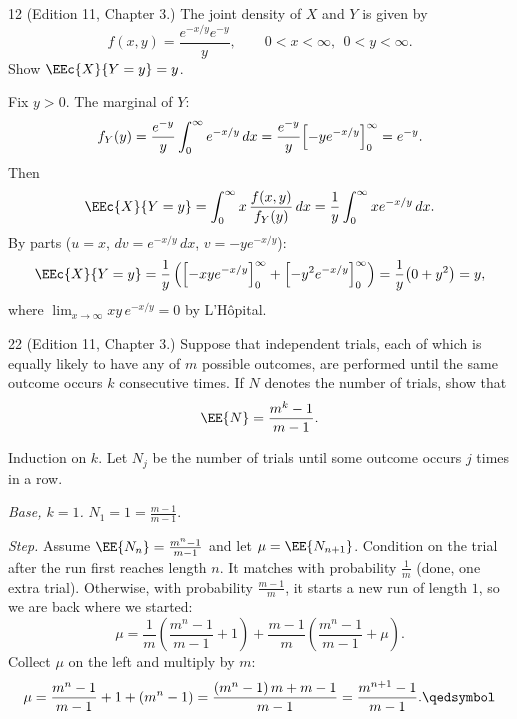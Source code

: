 \documentclass[11pt]{article}
\begin{document}
\begin{problem}{12}
  (Edition 11, Chapter 3.) The joint density of $X$ and $Y$ is given by
  \[
    f(x,y) = \frac{e^{-x/y} e^{-y}}{y}, \qquad 0 < x < \infty,\ \ 0 < y < \infty.
  \]
  Show $\EEc{X}{Y = y} = y$.
\end{problem}
Fix $y > 0$. The marginal of $Y$:
\[
  f_Y(y) = \frac{e^{-y}}{y}\int_0^{\infty} e^{-x/y}\,dx
         = \frac{e^{-y}}{y}\Bigl[-y e^{-x/y}\Bigr]_0^{\infty} = e^{-y}.
\]
Then
\[
  \EEc{X}{Y = y} = \int_0^{\infty} x\,\frac{f(x,y)}{f_Y(y)}\,dx
    = \frac{1}{y} \int_0^{\infty} x e^{-x/y}\,dx.
\]
By parts ($u = x$, $dv = e^{-x/y}\,dx$, $v = -y e^{-x/y}$):
\[
  \EEc{X}{Y = y}
    = \frac{1}{y}\left( \Bigl[-x y e^{-x/y}\Bigr]_0^{\infty}
        + \Bigl[-y^2 e^{-x/y}\Bigr]_0^{\infty} \right)
    = \frac{1}{y}\bigl(0 + y^2\bigr) = y,
\]
where $\lim_{x\to\infty} xy\,e^{-x/y} = 0$ by L'H\^opital. \qedsymbol

\begin{problem}{22}
  (Edition 11, Chapter 3.) Suppose that independent trials, each of which is
  equally likely to have any of $m$ possible outcomes, are performed until the
  same outcome occurs $k$ consecutive times. If $N$ denotes the number of
  trials, show that
  \[
    \EE{N} = \frac{m^{k} - 1}{m - 1}.
  \]
\end{problem}
Induction on $k$. Let $N_j$ be the number of trials until some outcome occurs $j$ times in a row.

\emph{Base, $k = 1$.} $N_1 = 1 = \frac{m - 1}{m - 1}$.

\emph{Step.} Assume $\EE{N_n} = \frac{m^n - 1}{m - 1}$ and let $\mu = \EE{N_{n+1}}$.
Condition on the trial after the run first reaches length $n$. It matches with probability $\frac1m$ (done, one extra trial).
Otherwise, with probability $\frac{m-1}{m}$, it starts a new run of length $1$, so we are back where we started:
\[
  \mu = \frac{1}{m}\left( \frac{m^n - 1}{m - 1} + 1 \right)
      + \frac{m - 1}{m}\left( \frac{m^n - 1}{m - 1} + \mu \right).
\]
Collect $\mu$ on the left and multiply by $m$:
\[
  \mu = \frac{m^n - 1}{m - 1} + 1 + (m^n - 1)
      = \frac{(m^n - 1)\,m + m - 1}{m - 1}
      = \frac{m^{n+1} - 1}{m - 1}. \qedsymbol
\]
\end{document}
